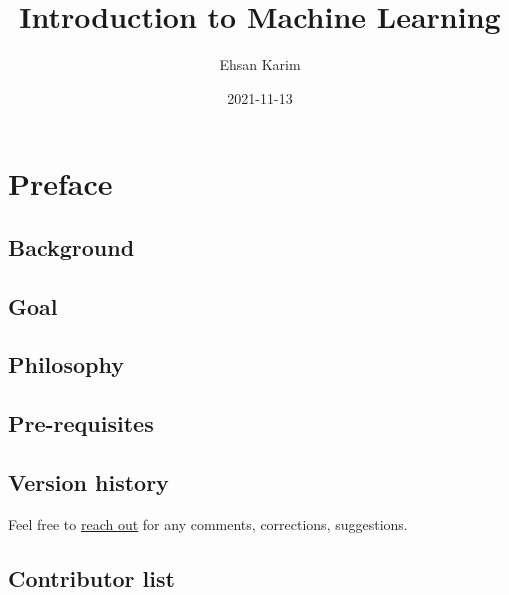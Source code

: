 \documentclass[
]{book}
\title{Introduction to Machine Learning}
\author{Ehsan Karim}
\date{2021-11-13}
\begin{document}
\maketitle

{
\setcounter{tocdepth}{1}
\tableofcontents
}
\newenvironment{blackbox}{
  \definecolor{shadecolor}{rgb}{0, 0, 0}  %
  \color{white}
  \begin{shaded}}
 {\end{shaded}}

\hypertarget{preface}{%
\chapter*{Preface}\label{preface}}

\hypertarget{background}{%
\section*{Background}\label{background}}

\hypertarget{goal}{%
\section*{Goal}\label{goal}}

\hypertarget{philosophy}{%
\section*{Philosophy}\label{philosophy}}

\hypertarget{pre-requisites}{%
\section*{Pre-requisites}\label{pre-requisites}}

\hypertarget{version-history}{%
\section*{Version history}\label{version-history}}

Feel free to \href{https://ehsank.com/}{reach out} for any comments, corrections, suggestions.

\hypertarget{contributor-list}{%
\section*{Contributor list}\label{contributor-list}}
\end{document}
